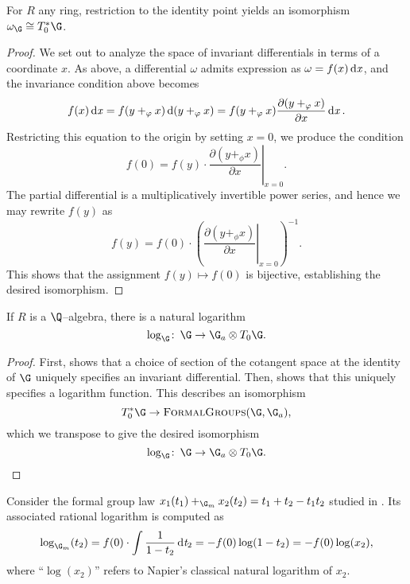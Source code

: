 \begin{lemma}\label{InvDifflsAreDeterminedByConstantTerm}
For \(R\) any ring, restriction to the identity point yields an isomorphism \(\omega_{\G} \cong T_0^* \G\).
\end{lemma}
\begin{proof}
We set out to analyze the space of invariant differentials in terms of a coordinate \(x\).  As above, a differential \(\omega\) admits expression as \(\omega = f(x) \operatorname{d\mathit{x}}\), and the invariance condition above becomes \[f(x) \operatorname{d\mathit{x}} = f(y +_\varphi x) \operatorname{d}(y +_\varphi x) = f(y +_\varphi x) \frac{\partial(y +_\varphi x)}{\partial x} \operatorname{d\mathit{x}}.\]  Restricting this equation to the origin by setting \(x = 0\), we produce the condition \[f(0) = f(y) \cdot \left. \frac{\partial(y +_\phi x)}{\partial x} \right|_{x=0}.\]  The partial differential is a multiplicatively invertible power series, and hence we may rewrite \(f(y)\) as \[f(y) = f(0) \cdot \left(\left. \frac{\partial(y +_\phi x)}{\partial x} \right|_{x=0}\right)^{-1}.\]  This shows that the assignment \(f(y) \mapsto f(0)\) is bijective, establishing the desired isomorphism.
\end{proof}

\begin{theorem}\label{RationalFGLsHaveLogarithms}
If \(R\) is a \(\Q\)--algebra, there is a natural logarithm \[\log_{\G}\co \G \to \G_a \otimes T_0 \G.\]
\end{theorem}
\begin{proof}
First,  shows that a choice of section of the cotangent space at the identity of \(\G\) uniquely specifies an invariant differential.  Then,  shows that this uniquely specifies a logarithm function.  This describes an isomorphism \[T_0^* \G \to \CatOf{FormalGroups}(\G, \G_a),\] which we transpose to give the desired isomorphism \[\log_{\G}\co \G \to \G_a \otimes T_0 \G. \qedhere\]
\end{proof}

\begin{example}\label{GmAndItsLogExample}
Consider the formal group law \(x_1(t_1) +_{\G_m} x_2(t_2) = t_1 + t_2 - t_1 t_2\) studied in .  Its associated rational logarithm is computed as \[\log_{\G_m}(t_2) = f(0) \cdot \int \frac{1}{1 - t_2} \operatorname{d\mathit{t}_2} = -f(0) \log(1 - t_2) = -f(0) \log(x_2),\] where ``\(\log(x_2)\)'' refers to Napier's classical natural logarithm of \(x_2\).
\end{example}









